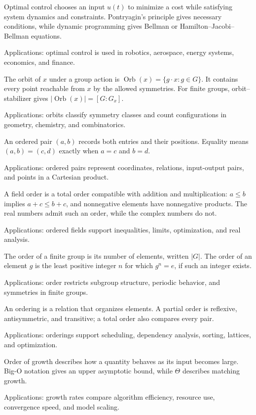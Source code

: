 Optimal control chooses an input $u(t)$ to minimize a cost while satisfying system dynamics and constraints. Pontryagin's principle gives necessary conditions, while dynamic programming gives Bellman or Hamilton--Jacobi--Bellman equations. \par\noindent Applications: optimal control is used in robotics, aerospace, energy systems, economics, and finance.

The orbit of $x$ under a group action is $\operatorname{Orb}(x)=\{g\cdot x:g\in G\}$. It contains every point reachable from $x$ by the allowed symmetries. For finite groups, orbit--stabilizer gives $|\operatorname{Orb}(x)|=[G:G_x]$. \par\noindent Applications: orbits classify symmetry classes and count configurations in geometry, chemistry, and combinatorics.

An ordered pair $(a,b)$ records both entries and their positions. Equality means $(a,b)=(c,d)$ exactly when $a=c$ and $b=d$. \par\noindent Applications: ordered pairs represent coordinates, relations, input-output pairs, and points in a Cartesian product.

A field order is a total order compatible with addition and multiplication: $a\leq b$ implies $a+c\leq b+c$, and nonnegative elements have nonnegative products. The real numbers admit such an order, while the complex numbers do not. \par\noindent Applications: ordered fields support inequalities, limits, optimization, and real analysis.

The order of a finite group is its number of elements, written $|G|$. The order of an element $g$ is the least positive integer $n$ for which $g^n=e$, if such an integer exists. \par\noindent Applications: order restricts subgroup structure, periodic behavior, and symmetries in finite groups.

An ordering is a relation that organizes elements. A partial order is reflexive, antisymmetric, and transitive; a total order also compares every pair. \par\noindent Applications: orderings support scheduling, dependency analysis, sorting, lattices, and optimization.

Order of growth describes how a quantity behaves as its input becomes large. Big-O notation gives an upper asymptotic bound, while $\Theta$ describes matching growth. \par\noindent Applications: growth rates compare algorithm efficiency, resource use, convergence speed, and model scaling.


